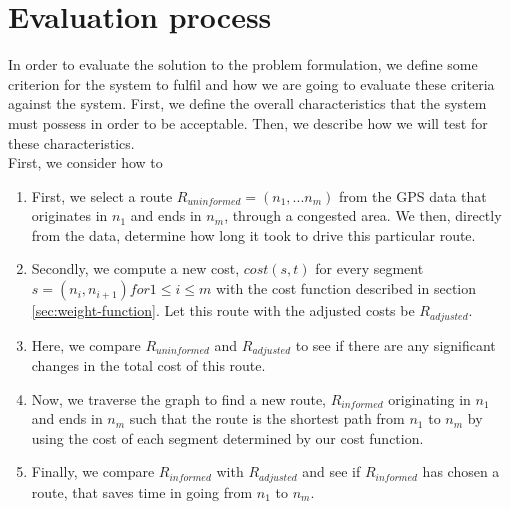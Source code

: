 \section{Evaluation process}
In order to evaluate the solution to the problem formulation, we define some criterion for the system to fulfil and how we are going to evaluate these criteria against the system. First, we define the overall characteristics that the system must possess in order to be acceptable. Then, we describe how we will test for these characteristics.
\\



First, we consider how to
\begin{enumerate}
\item First, we select a route $R_{uninformed}=(n_1,...n_m)$ from the GPS data that originates in $n_1$ and ends in $n_m$, through a congested area. We then, directly from the data, determine how long it took to drive this particular route.
\item Secondly, we compute a new cost, $cost(s, t)$ for every segment $s=(n_i,n_{i+1}) for 1 \leq i \leq m$ with the cost function described in section \ref{sec:weight-function}. Let this route with the adjusted costs be $R_{adjusted}$.
\item Here, we compare $R_{uninformed}$ and $R_{adjusted}$ to see if there are any significant changes in the total cost of this route.
\item Now, we traverse the graph to find a new route, $R_{informed}$ originating in $n_1$ and ends in $n_m$ such that the route is the shortest path from $n_1$ to $n_m$ by using the cost of each segment determined by our cost function.
\item Finally, we compare $R_{informed}$ with $R_{adjusted}$ and see if $R_{informed}$ has chosen a route, that saves time in going from $n_1$ to $n_m$.
\end{enumerate}
